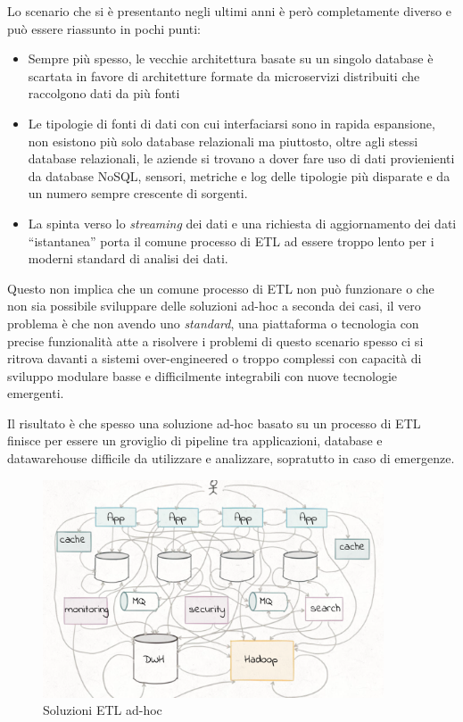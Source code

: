 \documentclass[]{article}
\providecommand{\tightlist}{%
  \setlength{\itemsep}{0pt}\setlength{\parskip}{0pt}}
\begin{document}
Lo scenario che si è presentanto negli ultimi anni è però completamente
diverso e può essere riassunto in pochi punti:

\begin{itemize}
\tightlist
\item
  Sempre più spesso, le vecchie architettura basate su un singolo
  database è scartata in favore di architetture formate da microservizi
  distribuiti che raccolgono dati da più fonti
\item
  Le tipologie di fonti di dati con cui interfaciarsi sono in rapida
  espansione, non esistono più solo database relazionali ma piuttosto,
  oltre agli stessi database relazionali, le aziende si trovano a dover
  fare uso di dati provienienti da database NoSQL, sensori, metriche e
  log delle tipologie più disparate e da un numero sempre crescente di
  sorgenti.
\item
  La spinta verso lo \emph{streaming} dei dati e una richiesta di
  aggiornamento dei dati ``istantanea'' porta il comune processo di ETL
  ad essere troppo lento per i moderni standard di analisi dei dati.
\end{itemize}

Questo non implica che un comune processo di ETL non può funzionare o
che non sia possibile sviluppare delle soluzioni ad-hoc a seconda dei
casi, il vero problema è che non avendo uno \emph{standard}, una
piattaforma o tecnologia con precise funzionalità atte a risolvere i
problemi di questo scenario spesso ci si ritrova davanti a sistemi
over-engineered o troppo complessi con capacità di sviluppo modulare
basse e difficilmente integrabili con nuove tecnologie emergenti.

Il risultato è che spesso una soluzione ad-hoc basato su un processo di
ETL finisce per essere un groviglio di pipeline tra applicazioni,
database e datawarehouse difficile da utilizzare e analizzare,
sopratutto in caso di emergenze.

\begin{figure}
\centering
\includegraphics[width=0.90000\textwidth]{../images/etl-adhoc.png}
\caption{Soluzioni ETL ad-hoc \label{figure_5}}
\end{figure}
\end{document}
